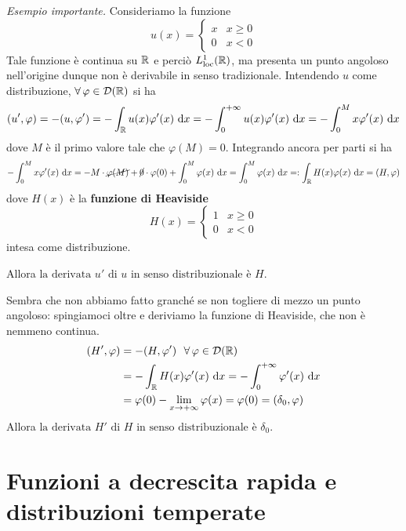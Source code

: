 \textit{Esempio importante.} Consideriamo la funzione
\begin{equation*}
u(x) =
\begin{cases}
x & x \geq 0\\
0 & x < 0
\end{cases}
\end{equation*}
Tale funzione è continua su $\mathbb{R}$ e perciò $L^1_{\operatorname{loc}}(\mathbb{R})$, ma presenta un punto angoloso nell'origine dunque non è derivabile in senso tradizionale. Intendendo $u$ come distribuzione, $\forall\varphi \in \Dc(\RR)$ si ha
\begin{equation*}
(u', \varphi) = - (u, \varphi') = - \int_{\mathbb{R}} u(x) \varphi'(x) \  \mathrm{d} x=- \int_0^{+\infty} u(x) \varphi'(x) \  \mathrm{d} x = - \int^{M}_{0} x\varphi'(x) \  \mathrm{d} x
\end{equation*}
dove $M$ è il primo valore tale che $\varphi(M)=0$. Integrando ancora per parti si ha
\begin{equation*}
- \int^{M}_{0} x\varphi'(x) \  \mathrm{d} x =-M\cdot\cancel{\varphi(M)}+\cancel{0}\cdot\varphi(0)+\int^{M}_{0} \varphi (x) \  \mathrm{d} x = \int^{M}_{0} \varphi (x) \  \mathrm{d} x=: \int_{\mathbb{R}} H(x) \varphi (x) \  \mathrm{d} x = (H, \varphi)
\end{equation*}
dove $H(x)$ è la \textbf{funzione di Heaviside}
\begin{equation*}
H(x) =
\begin{cases}
1 & x \geq 0\\
0 & x < 0
\end{cases}
\end{equation*}
intesa come distribuzione.

Allora $\boxed{\text{la derivata } u'\text{ di } u\text{ in senso distribuzionale è }H}$.

Sembra che non abbiamo fatto granché se non togliere di mezzo un punto angoloso: spingiamoci oltre e deriviamo la funzione di Heaviside, che non è nemmeno continua.
\begin{align*}
(H', \varphi) & = - (H, \varphi') \ \ \forall \varphi \in \Dc(\RR)\\
 & = - \int_{\RR} H(x) \varphi'(x) \dx = - \int^{+ \infty}_{0} \varphi'(x) \dx\\
 & = \varphi (0) - \lim_{x\rightarrow + \infty} \varphi (x) = \varphi (0) = (\delta_{0}, \varphi)
\end{align*}
Allora $\boxed{\text{la derivata } H'\text{ di } H\text{ in senso distribuzionale è }\delta_0}$.


\section{Funzioni a decrescita rapida e distribuzioni temperate}

